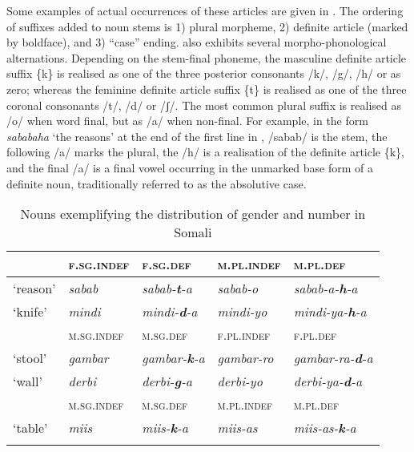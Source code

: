 \documentclass[output=paper]{langsci/langscibook}
\begin{document}
Some examples of actual occurrences of these articles are given in . The ordering of suffixes added to noun stems is 
1) plural morpheme, 
2) definite article (marked by boldface), 
and 3) “case” ending.  also exhibits several morpho-phonological alternations. Depending on the stem-final phoneme, the masculine definite article suffix \{k\} is realised as one of the three posterior consonants /k/, /g/, /h/ or as zero; whereas the feminine definite article suffix \{t\} is realised as one of the three coronal consonants /t/, /d/ or /ʃ/. The most common plural suffix is realised as /o/ when word final, but as /a/ when non-final. For example, in the form \textit{sababaha} ‘the reasons’ at the end of the first line in , /sabab/ is the stem, the following /a/ marks the plural, the /h/ is a realisation of the definite article \{k\}, and the final /a/ is a final vowel occurring in the unmarked base form of a definite noun, traditionally referred to as the absolutive case.
 
\begin{table}
\caption{Nouns exemplifying the distribution of gender and number in Somali}
\label{tab:nilsson:2}

\begin{tabularx}{\textwidth}{llXlX}
\lsptoprule
& {\textsc{f.sg.indef}} & {\textsc{f.sg.def}} & {\textsc{m.pl.indef}} & {\textsc{m.pl.def}}\\
\midrule
{‘reason’} & {\textit{sabab}} & {\textit{sabab-}\textbf{\textit{t}}\textit{-a}} & {\textit{sabab-o}} & {\textit{sabab-a-}\textbf{\textit{h}}\textit{-a}} \\

{‘knife’} & {\textit{mindi}} & {\textit{mindi-}\textbf{\textit{d}}\textit{-a}} &  {\textit{mindi-yo}} &  {\textit{mindi-ya-}\textbf{\textit{h}}\textit{-a}}\\

\tablevspace
& {\textsc{m.sg.indef}} & {\textsc{m.sg.def}} & {\textsc{f.pl.indef}} & {\textsc{f.pl.def}}\\
\midrule
{‘stool’}  & {\textit{gambar}} & {\textit{gambar-}\textbf{\textit{k}}\textit{-a}} & {\textit{gambar-ro}} & {\textit{gambar-ra-}\textbf{\textit{d}}\textit{-a}} \\

{‘wall’} & {\textit{derbi}} & {\textit{derbi-}\textbf{\textit{g}}\textit{-a}} & {\textit{derbi-yo}} & 
{\textit{derbi-ya-}\textbf{\textit{d}}\textit{-a}} \\

\tablevspace
& {\textsc{m.sg.indef}} & {\textsc{m.sg.def}} & {\textsc{m.pl.indef}} & {\textsc{m.pl.def}}\\

\midrule
{‘table’} & {\textit{miis}} & {\textit{miis-}\textbf{\textit{k}}\textit{-a}} & {\textit{miis-as}} & {\textit{miis-as-}\textbf{\textit{k}}\textit{-a}} \\
\lspbottomrule
\end{tabularx}

\end{table} 
\end{document}

